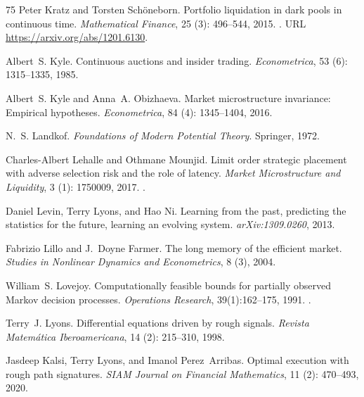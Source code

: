 \documentclass[11pt]{article}
\numberwithin{equation}{section}
\theoremstyle{definition}
\theoremstyle{remark}
\theoremstyle{definition}
\begin{document}
\begin{thebibliography}{75}
Peter Kratz and Torsten Sch{\"o}neborn.
\newblock Portfolio liquidation in dark pools in continuous time.
\newblock \emph{Mathematical Finance}, 25 (3): 496--544,
  2015.
\newblock {}.
\newblock URL \url{https://arxiv.org/abs/1201.6130}.

Albert~S. Kyle.
\newblock Continuous auctions and insider trading.
\newblock \emph{Econometrica}, 53 (6): 1315--1335, 1985.

Albert~S. Kyle and Anna~A. Obizhaeva.
\newblock Market microstructure invariance: Empirical hypotheses.
\newblock \emph{Econometrica}, 84 (4): 1345--1404, 2016.

N.~S. Landkof.
\newblock \emph{Foundations of Modern Potential Theory}.
\newblock Springer, 1972.

Charles-Albert Lehalle and Othmane Mounjid.
\newblock Limit order strategic placement with adverse selection risk and the
  role of latency.
\newblock \emph{Market Microstructure and Liquidity}, 3 (1):
  1750009, 2017.
\newblock {}.

Daniel Levin, Terry Lyons, and Hao Ni.
\newblock Learning from the past, predicting the statistics for the future,
  learning an evolving system.
\newblock \emph{arXiv:1309.0260}, 2013.

Fabrizio Lillo and J.~Doyne Farmer.
\newblock The long memory of the efficient market.
\newblock \emph{Studies in Nonlinear Dynamics and Econometrics}, 8
  (3), 2004.

William~S. Lovejoy.
\newblock Computationally feasible bounds for partially observed {Markov}
  decision processes.
\newblock \emph{Operations Research}, 39(1):162--175, 1991.
\newblock {}.

Terry~J. Lyons.
\newblock Differential equations driven by rough signals.
\newblock \emph{Revista Matem\'atica Iberoamericana}, 14 (2):
  215--310, 1998.

Jasdeep Kalsi, Terry Lyons, and Imanol Perez~Arribas.
\newblock Optimal execution with rough path signatures.
\newblock \emph{SIAM Journal on Financial Mathematics}, 11
  (2): 470--493, 2020.


\end{thebibliography}
\end{document}
